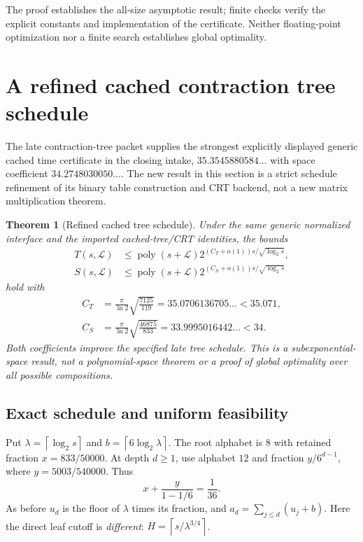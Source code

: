 \documentclass[11pt,letterpaper]{article}
\newtheorem{theorem}{Theorem}[section]\newtheorem{lemma}[theorem]{Lemma}\newtheorem{proposition}[theorem]{Proposition}\newtheorem{corollary}[theorem]{Corollary}
\theoremstyle{remark}\newtheorem{remark}[theorem]{Remark}
\newcommand{\poly}{\operatorname{poly}}\newcommand{\vTwo}{v_2}\newcommand{\ceil}[1]{\left\lceil#1\right\rceil}\newcommand{\floor}[1]{\left\lfloor#1\right\rfloor}\newcommand{\LL}{\mathcal L}\newcommand{\Pin}{ab2fbc9e03d5c3d0ad6dec8686960bfe498b0b06}
\begin{document}
The proof establishes the all-size asymptotic result; finite checks verify the explicit constants and implementation of the certificate. Neither floating-point optimization nor a finite search establishes global optimality.

\section{A refined cached contraction tree schedule}
\label{sec:memory}
The late contraction-tree packet supplies the strongest explicitly displayed
generic cached time certificate in the closing intake, $35.3545880584\ldots$
with space coefficient $34.2748030050\ldots$. The new result in this section
is a strict schedule refinement of its binary table construction and CRT
backend, not a new matrix multiplication theorem.

\begin{theorem}[Refined cached tree schedule]\label{thm:cache}
Under the same generic normalized interface and the imported cached-tree/CRT
identities, the bounds
\begin{align*}
 T(s,\LL)&\le\poly(s+\LL)2^{(C_T+o(1))s/\sqrt{\log_2s}},\\
 S(s,\LL)&\le\poly(s+\LL)2^{(C_S+o(1))s/\sqrt{\log_2s}}
\end{align*}
hold with
\begin{equation}\label{eq:cache-exact}
 \begin{aligned}
 C_T&=\frac\pi{\ln2}\sqrt{\frac{7125}{119}}
 =35.0706136705\ldots<35.071,\\
 C_S&=\frac\pi{\ln2}\sqrt{\frac{46875}{833}}
 =33.9995016442\ldots<34.
 \end{aligned}
\end{equation}
Both coefficients improve the specified late tree schedule. This is a
subexponential-space result, not a polynomial-space theorem or a proof of
global optimality over all possible compositions.
\end{theorem}

\subsection{Exact schedule and uniform feasibility}
Put $\lambda=\ceil{\log_2s}$ and $b=\ceil{6\log_2\lambda}$. The root
alphabet is $8$ with retained fraction $x=833/50000$. At depth $d\ge1$,
use alphabet $12$ and fraction $y/6^{d-1}$, where $y=5003/540000$.
Thus
\[
 x+\frac{y}{1-1/6}=\frac1{36}.
\]
As before $u_d$ is the floor of $\lambda$ times its fraction, and
$a_d=\sum_{j\le d}(u_j+b)$. Here the direct leaf cutoff is
\emph{different}: $H=\ceil{s/\lambda^{3/4}}$.
\end{document}
